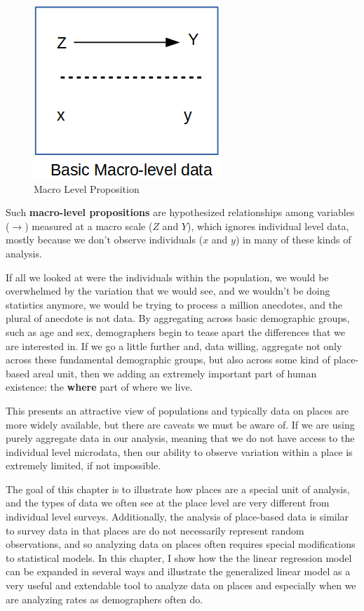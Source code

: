 \documentclass[
  letterpaper,
  DIV=11,
  numbers=noendperiod]{scrreprt}
\begin{document}
\begin{figure}

{\centering \includegraphics{images/macro2.png}

}

\caption{Macro Level Proposition}

\end{figure}

Such \textbf{macro-level propositions} are hypothesized relationships
among variables (\(\rightarrow\)) measured at a macro scale (\(Z\) and
\(Y\)), which ignores individual level data, mostly because we don't
observe individuals (\(x\) and \(y\)) in many of these kinds of
analysis.

If all we looked at were the individuals within the population, we would
be overwhelmed by the variation that we would see, and we wouldn't be
doing statistics anymore, we would be trying to process a million
anecdotes, and the plural of anecdote is not data. By aggregating across
basic demographic groups, such as age and sex, demographers begin to
tease apart the differences that we are interested in. If we go a little
further and, data willing, aggregate not only across these fundamental
demographic groups, but also across some kind of place-based areal unit,
then we adding an extremely important part of human existence: the
\textbf{where} part of where we live.

This presents an attractive view of populations and typically data on
places are more widely available, but there are caveats we must be aware
of. If we are using purely aggregate data in our analysis, meaning that
we do not have access to the individual level microdata, then our
ability to observe variation within a place is extremely limited, if not
impossible.

The goal of this chapter is to illustrate how places are a special unit
of analysis, and the types of data we often see at the place level are
very different from individual level surveys. Additionally, the analysis
of place-based data is similar to survey data in that places are do not
necessarily represent random observations, and so analyzing data on
places often requires special modifications to statistical models. In
this chapter, I show how the the linear regression model can be expanded
in several ways and illustrate the generalized linear model as a very
useful and extendable tool to analyze data on places and especially when
we are analyzing rates as demographers often do.
\end{document}
